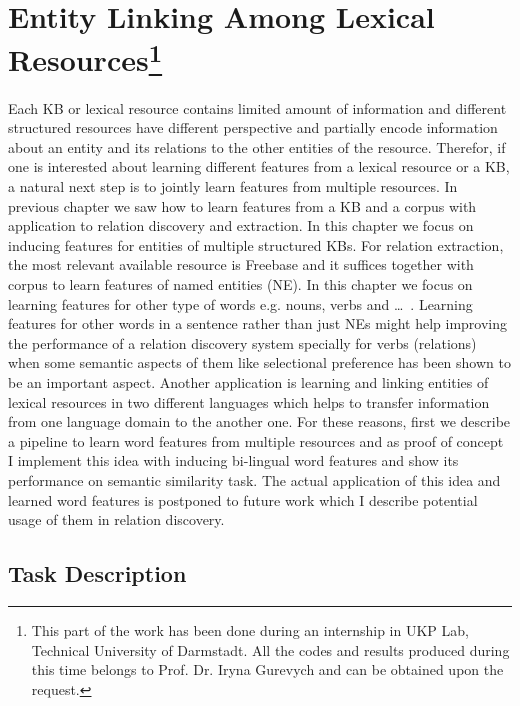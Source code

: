 \chapter[Entity Linking Among Lexical R]{Entity Linking Among Lexical Resources\footnote{This part of the work has been done during an internship in UKP
Lab, Technical University of Darmstadt. All the codes and results produced during
this time belongs to Prof. Dr. Iryna Gurevych and can be obtained upon the
request.}}

\label{ch:ent-link}


Each KB or lexical resource contains limited amount of information and
different structured resources have different perspective and partially encode
information about an entity and its relations to the other entities of the
resource. Therefor, if one is interested about learning different features from
a lexical resource or a KB, a natural next step is to jointly learn features
from multiple resources. In previous chapter we saw how to learn features from
a KB and a corpus with application to relation discovery and extraction. In this
chapter we focus on inducing features for entities of multiple structured KBs.
For relation extraction, the most relevant available resource is Freebase and
it suffices together with corpus to learn features of named entities (NE). In
this chapter we focus on learning features for other type of words e.g. nouns,
verbs and \ldots~. Learning features for other words in a sentence rather than
just NEs might help improving the performance of a relation discovery system
specially for verbs (relations) when some semantic aspects of them like
selectional preference has been shown to be an important aspect. Another
application is learning and linking entities of lexical resources in two
different languages which helps to transfer information from one language domain
to the another one. For these reasons, first we describe a pipeline to learn
word features from multiple resources and as proof of concept I implement this
idea with inducing bi-lingual word features and show its performance
on semantic similarity task. The actual application of this idea and learned
word features is postponed to future work which I describe potential usage of
them in relation discovery.


\section{Task Description}
\label{sec:xkb-task-desc}

